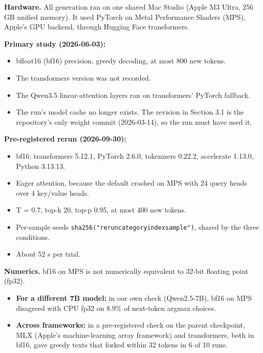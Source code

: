 \documentclass[11pt,letterpaper]{article}
\providecommand{\tightlist}{\setlength{\itemsep}{0pt}\setlength{\parskip}{0pt}}
\DeclareRobustCommand{\_}{\textunderscore\allowbreak}
\begin{document}
\textbf{Hardware.} All generation ran on one shared Mac Studio (Apple M3 Ultra, 256 GB unified memory). It used PyTorch on Metal Performance Shaders (MPS), Apple's GPU backend, through Hugging Face transformers.

\textbf{Primary study (2026-06-03):}

\begin{itemize}
\tightlist
\item
  bfloat16 (bf16) precision, greedy decoding, at most 800 new tokens.
\item
  The transformers version was not recorded.
\item
  The Qwen3.5 linear-attention layers ran on transformers' PyTorch fallback.
\item
  The run's model cache no longer exists. The revision in Section 3.1 is the repository's only weight commit (2026-03-14), so the run must have used it.
\end{itemize}

\textbf{Pre-registered rerun (2026-09-30):}

\begin{itemize}
\tightlist
\item
  bf16; transformers 5.12.1, PyTorch 2.6.0, tokenizers 0.22.2, accelerate 1.13.0, Python 3.13.13.
\item
  Eager attention, because the default crashed on MPS with 24 query heads over 4 key/value heads.
\item
  T = 0.7, top-k 20, top-p 0.95, at most 400 new tokens.
\item
  Per-sample seeds \texttt{sha256("rerun\textbar{}category\textbar{}index\textbar{}sample")}, shared by the three conditions.
\item
  About 52 s per trial.
\end{itemize}

\textbf{Numerics.} bf16 on MPS is not numerically equivalent to 32-bit floating point (fp32).

\begin{itemize}
\tightlist
\item
  \textbf{For a different 7B model:} in our own check (Qwen2.5-7B), bf16 on MPS disagreed with CPU fp32 on 8.9\% of next-token argmax choices.
\item
  \textbf{Across frameworks:} in a pre-registered check on the parent checkpoint, MLX (Apple's machine-learning array framework) and transformers, both in bf16, gave greedy texts that forked within 32 tokens in 6 of 10 runs.
\end{itemize}
\end{document}
